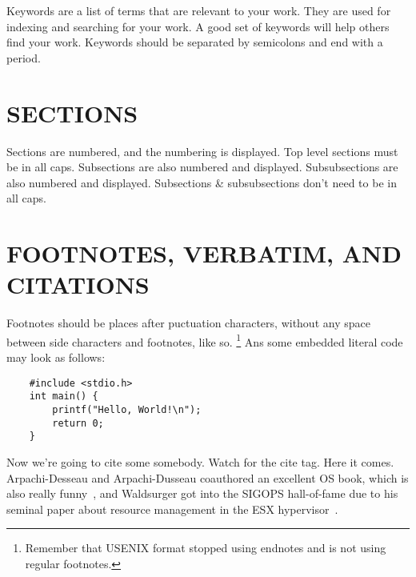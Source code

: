 \documentclass[letterpaper,twocolumn,draft]{article}
\begin{document}
Keywords are a list of terms that are relevant to your work. They are used 
for indexing and searching for your work. A good set of keywords will help 
others find your work. Keywords should be separated by semicolons and end 
with a period.

\section{\MakeUppercase{Sections}}
Sections are numbered, and the numbering is displayed. Top level sections must 
be in all caps. Subsections are also numbered and displayed. Subsubsections 
are also numbered and displayed. Subsections \& subsubsections don't need to
be in all caps.

\section{\MakeUppercase{Footnotes, Verbatim, and Citations}}
Footnotes should be places after puctuation characters, without any space 
between side characters and footnotes, like so.
\footnote{
    Remember that USENIX format stopped using endnotes and is not using regular
    footnotes.}
Ans some embedded literal code may look as follows:
\begin{verbatim}
    #include <stdio.h>
    int main() {
        printf("Hello, World!\n");
        return 0;
    }
\end{verbatim}

Now we're going to cite some somebody. Watch for the cite tag. Here it comes.
Arpachi-Desseau and Arpachi-Dusseau coauthored an excellent OS book, which is 
also really funny~\cite{test}, and Waldsurger got into the 
SIGOPS hall-of-fame due to his seminal paper about resource management in the
ESX hypervisor~\cite{test}.



\end{document}
